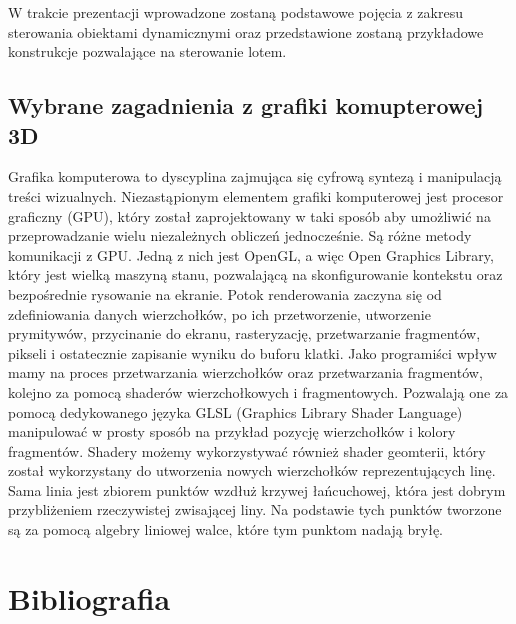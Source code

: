 \documentclass[15pt]{sprawozdanie}
\begin{document}
W trakcie prezentacji wprowadzone zostaną podstawowe pojęcia z zakresu sterowania obiektami dynamicznymi oraz przedstawione zostaną przykładowe konstrukcje pozwalające na sterowanie lotem.

\subsection{Wybrane zagadnienia z grafiki komupterowej 3D}

Grafika komputerowa to dyscyplina zajmująca się cyfrową syntezą i manipulacją treści wizualnych. Niezastąpionym elementem grafiki komputerowej jest procesor graficzny (GPU), który został zaprojektowany w taki sposób aby umożliwić na przeprowadzanie wielu niezależnych obliczeń jednocześnie. Są różne metody komunikacji z GPU. Jedną z nich jest OpenGL, a więc Open Graphics Library, który jest wielką maszyną stanu, pozwalającą na skonfigurowanie kontekstu oraz bezpośrednie rysowanie na ekranie. Potok renderowania zaczyna się od zdefiniowania danych wierzchołków, po ich przetworzenie, utworzenie prymitywów, przycinanie do ekranu, rasteryzację, przetwarzanie fragmentów, pikseli i ostatecznie zapisanie wyniku do buforu klatki. Jako programiści wpływ mamy na proces przetwarzania wierzchołków oraz przetwarzania fragmentów, kolejno za pomocą shaderów wierzchołkowych i fragmentowych. Pozwalają one za pomocą dedykowanego języka GLSL (Graphics Library Shader Language) manipulować w prosty sposób na przykład pozycję wierzchołków i kolory fragmentów. Shadery możemy wykorzystywać również shader geomterii, który został wykorzystany do utworzenia nowych wierzchołków reprezentujących linę. Sama linia jest zbiorem punktów wzdłuż krzywej łańcuchowej, która jest dobrym przybliżeniem rzeczywistej zwisającej liny. Na podstawie tych punktów tworzone są za pomocą algebry liniowej walce, które tym punktom nadają bryłę.


\newpage
\section{Bibliografia}

\nocite{*}

\printbibliography[type=book,heading=subbibliography,title={Literatura}]
\printbibliography[type=article,heading=subbibliography,title={Artykuły}]
\printbibliography[type=online,heading=subbibliography,title={Źródła internetowe}]
\end{document}
